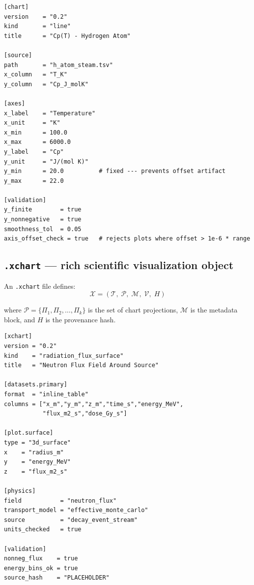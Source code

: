 \documentclass[11pt, a4paper, oneside]{article}
\newcommand{\Tab}{\mathcal{T}}           %
\newcommand{\Proj}{\Pi}                  %
\newcommand{\Val}{\mathcal{V}}           %
\begin{document}
\begin{lstlisting}[caption={\texttt{.chart} format example.}]
[chart]
version    = "0.2"
kind       = "line"
title      = "Cp(T) - Hydrogen Atom"

[source]
path       = "h_atom_steam.tsv"
x_column   = "T_K"
y_column   = "Cp_J_molK"

[axes]
x_label    = "Temperature"
x_unit     = "K"
x_min      = 100.0
x_max      = 6000.0
y_label    = "Cp"
y_unit     = "J/(mol K)"
y_min      = 20.0          # fixed --- prevents offset artifact
y_max      = 22.0

[validation]
y_finite        = true
y_nonnegative   = true
smoothness_tol  = 0.05
axis_offset_check = true   # rejects plots where offset > 1e-6 * range
\end{lstlisting}

\subsection{\texttt{.xchart} --- rich scientific visualization object}

An \texttt{.xchart} file defines:
\begin{equation}
  \mathcal{X} = (\Tab,\; \mathcal{P},\; \mathcal{M},\; \Val,\; H)
  \label{eq:xchart}
\end{equation}

where $\mathcal{P} = \{\Proj_1, \Proj_2, \ldots, \Proj_k\}$ is the set of
chart projections, $\mathcal{M}$ is the metadata block, and $H$ is the
provenance hash.

\begin{lstlisting}[caption={\texttt{.xchart} --- radiation flux surface.}]
[xchart]
version = "0.2"
kind    = "radiation_flux_surface"
title   = "Neutron Flux Field Around Source"

[datasets.primary]
format  = "inline_table"
columns = ["x_m","y_m","z_m","time_s","energy_MeV",
           "flux_m2_s","dose_Gy_s"]

[plot.surface]
type = "3d_surface"
x    = "radius_m"
y    = "energy_MeV"
z    = "flux_m2_s"

[physics]
field           = "neutron_flux"
transport_model = "effective_monte_carlo"
source          = "decay_event_stream"
units_checked   = true

[validation]
nonneg_flux    = true
energy_bins_ok = true
source_hash    = "PLACEHOLDER"
\end{lstlisting}
\end{document}
